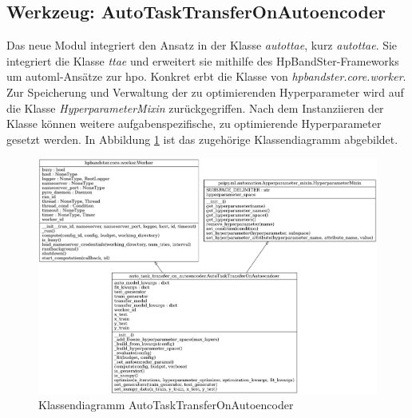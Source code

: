 	\subsection{Werkzeug: AutoTaskTransferOnAutoencoder}
	\label{subsec:AutoTaskTransferOnAutoencoder}
	Das neue Modul integriert den Ansatz in der Klasse \textit{\acl{autottae}}, kurz \textit{\ac{autottae}}. Sie integriert die Klasse \textit{\acl{ttae}} und erweitert sie mithilfe des HpBandSter-Frameworks um \ac{automl}-Ansätze zur \ac{hpo}. Konkret erbt die Klasse von \textit{hpbandster.core.worker}. Zur Speicherung und Verwaltung der zu optimierenden Hyperparameter wird auf die Klasse \textit{HyperparameterMixin} zurückgegriffen. Nach dem Instanziieren der Klasse können weitere aufgabenspezifische, zu optimierende Hyperparameter gesetzt werden. In Abbildung \ref{img:KlassendiagrammAutoTaskTransferOnAutoencoder}  ist das zugehörige Klassendiagramm abgebildet. 
	\begin{figure}[h]
		\centering
		\includegraphics[width=1\textwidth, center]{bilder/Klassendiagramme/AutoTTAE.png}
		\caption[Klassendiagramm AutoTaskTransferOnAutoencoder]{Klassendiagramm AutoTaskTransferOnAutoencoder}
		\label{img:KlassendiagrammAutoTaskTransferOnAutoencoder}
	\end{figure}  

